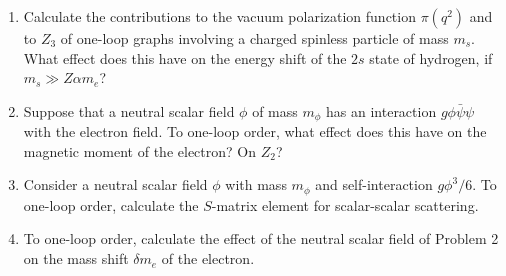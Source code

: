

\begin{enumerate}
\item Calculate the contributions to the vacuum polarization function
$\pi(q^2)$ and to $Z_3$ of one-loop graphs involving a charged spinless
particle of mass $m_s$. What effect does this have on the energy shift of the
$2s$ state of hydrogen, if $m_s \gg Z\alpha m_e$?

\item Suppose that a neutral scalar field $\phi$ of mass $m_\phi$ has an
interaction $g\phi\bar\psi\psi$ with the electron field. To one-loop order,
what effect does this have on the magnetic moment of the electron? On $Z_2$?

\item Consider a neutral scalar field $\phi$ with mass $m_\phi$ and
self-interaction $g\phi^3/6$. To one-loop order, calculate the $S$-matrix
element for scalar-scalar scattering.

\item To one-loop order, calculate the effect of the neutral scalar field of
Problem 2 on the mass shift $\delta m_e$ of the electron.
\end{enumerate}


